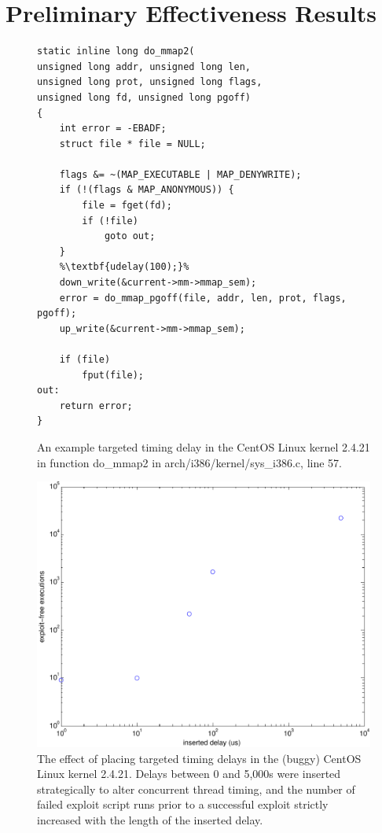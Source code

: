 \documentclass[12pt,conference]{IEEEtran}
\begin{document}
\section{Preliminary Effectiveness Results}
\begin{figure}
\begin{lstlisting}[firstnumber=43]
static inline long do_mmap2(
unsigned long addr, unsigned long len,
unsigned long prot, unsigned long flags,
unsigned long fd, unsigned long pgoff)
{
	int error = -EBADF;
	struct file * file = NULL;

	flags &= ~(MAP_EXECUTABLE | MAP_DENYWRITE);
	if (!(flags & MAP_ANONYMOUS)) {
		file = fget(fd);
		if (!file)
			goto out;
	}
	%\textbf{udelay(100);}%
	down_write(&current->mm->mmap_sem);
	error = do_mmap_pgoff(file, addr, len, prot, flags, pgoff);
	up_write(&current->mm->mmap_sem);

	if (file)
		fput(file);
out:
	return error;
}
\end{lstlisting}
\caption{An example targeted timing delay in the CentOS Linux kernel 2.4.21 in function do\_mmap2 in arch/i386/kernel/sys\_i386.c, line 57.}
\label{fig_mmapcode}
\end{figure}
\begin{figure}
\centering
\includegraphics[width=\columnwidth]{prelimgraph}
\caption{The effect of placing targeted timing delays in the (buggy) CentOS Linux kernel 2.4.21.  Delays between 0 and 5,000{\textmu}s were inserted strategically to alter concurrent thread timing, and the number of failed exploit script runs prior to a successful exploit strictly increased with the length of the inserted delay.}
\label{fig_prelimgraph}
\end{figure}
\end{document}
